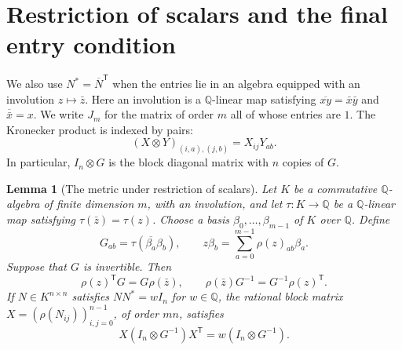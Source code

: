\documentclass[10pt]{article}
\newtheorem{lemma}[theorem]{Lemma}
\newcommand{\Q}{\mathbb Q}
\begin{document}
\section{Restriction of scalars and the final entry condition}
\label{sec:restriction}

We also use $N^*=\overline N^{\mathsf T}$ when the entries lie in an
algebra equipped with an involution $z\mapsto\bar z$.
Here an involution is a $\Q$-linear map satisfying
$\overline{xy}=\bar x\bar y$ and $\overline{\bar x}=x$.
We write $J_m$ for the matrix of order $m$ all of whose entries are $1$.
The Kronecker product is indexed by pairs:
\[
 (X\otimes Y)_{(i,a),(j,b)}=X_{ij}Y_{ab}.
\]
In particular, $I_n\otimes G$ is the block diagonal matrix with $n$
copies of $G$.

\begin{lemma}[The metric under restriction of scalars]
\label{lem:trace-restriction}
Let $K$ be a commutative $\Q$-algebra of finite dimension $m$, with an
involution, and let $\tau:K\longrightarrow\Q$ be a $\Q$-linear map
satisfying $\tau(\bar z)=\tau(z)$. Choose a basis
$\beta_0,\ldots,\beta_{m-1}$ of $K$ over $\Q$. Define
\[
 G_{ab}=\tau(\overline{\beta_a}\beta_b),\qquad
 z\beta_b=\sum_{a=0}^{m-1}\rho(z)_{ab}\beta_a.
\]
Suppose that $G$ is invertible. Then
\begin{equation}\label{eq:trace-adjoint}
 \rho(z)^{\mathsf T}G=G\rho(\bar z),\qquad
 \rho(\bar z)G^{-1}=G^{-1}\rho(z)^{\mathsf T}.
\end{equation}
If $N\in K^{n\times n}$ satisfies $NN^*=wI_n$ for $w\in\Q$, the
rational block matrix $X=(\rho(N_{ij}))_{i,j=0}^{n-1}$, of order $mn$,
satisfies
\begin{equation}\label{eq:inverse-metric-gram}
 X(I_n\otimes G^{-1})X^{\mathsf T}
       =w(I_n\otimes G^{-1}).
\end{equation}
\end{lemma}
\end{document}
